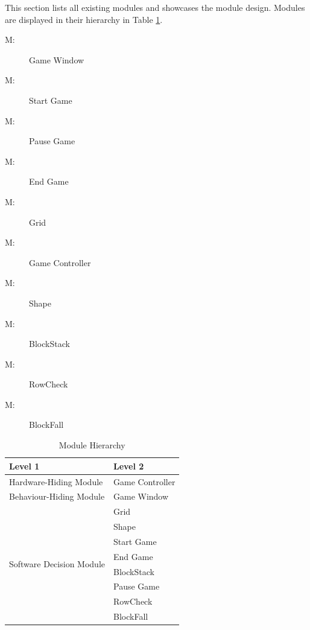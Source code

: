 \documentclass[12pt, titlepage]{article}
\newcounter{mnum}
\newcommand{\mthemnum}{M\themnum}
\begin{document}
This section lists all existing modules and showcases the module design. Modules are displayed in their hierarchy in Table \ref{TblMH}.

\begin{description}
\item [ \mthemnum \label{mHH}:] Game Window
\item [ \mthemnum \label{mHH}:] Start Game
\item [ \mthemnum \label{mHH}:] Pause Game
\item [ \mthemnum \label{mHH}:] End Game
\item [ \mthemnum \label{mHH}:] Grid
\item [ \mthemnum \label{mHH}:] Game Controller
\item [ \mthemnum \label{mHH}:] Shape
\item [ \mthemnum \label{mHH}:] BlockStack
\item [ \mthemnum \label{mHH}:] RowCheck
\item [ \mthemnum \label{mHH}:] BlockFall

\end{description}


\begin{table}[h!]
\centering
\begin{tabular}{p{} p{}}
\toprule
\textbf{Level 1} & \textbf{Level 2}\\
\midrule

{Hardware-Hiding Module} & Game Controller\\
\midrule

\multirow{1}{0.3\textwidth}{Behaviour-Hiding Module} 
& Game Window\\
\midrule

\multirow{8}{0.3\textwidth}{Software Decision Module} & {Grid}\\
& Shape\\
& Start Game\\
& End Game\\
& BlockStack\\
& Pause Game\\
& RowCheck\\
& BlockFall\\
\bottomrule

\end{tabular}
\caption{Module Hierarchy}
\label{TblMH}
\end{table}
\end{document}
